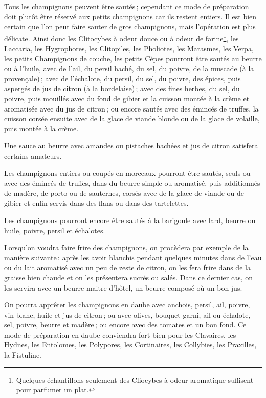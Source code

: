 \medskip

Tous les champignons peuvent être sautés ; cependant ce mode de préparation
doit plutôt être réservé aux petits champignons car ils restent entiers. Il est
bien certain que l'on peut faire sauter de gros champignons, mais l'opération
est plus délicate. Ainsi donc les Clitocybes à odeur douce ou à odeur de
farine\footnote{Quelques échantillons seulement des Cliocybes à odeur
aromatique suffisent pour parfumer un plat.}, les Laccaria, les Hygrophores,
les Clitopiles, les Pholiotes, les Marasmes, les Verpa, les petits Champignons
de couche, les petits Cèpes pourront être sautés au beurre ou à l'huile, avec
de l'ail, du persil haché, du sel, du poivre, de la muscade (à la provençale) ;
avec de l'échalote, du persil, du sel, du poivre, des épices, puis aspergés de
jus de citron (à la bordelaise) ; avec des fines herbes, du sel, du poivre,
puis mouillés avec du fond de gibier et la cuisson montée à la crème et
aromatisée avec du jus de citron ; ou encore sautés avec des émincés de
truffes, la cuisson corsée ensuite avec de la glace de viande blonde ou de la
glace de volaille, puis montée à la crème.

Une sauce au beurre avec amandes ou pistaches hachées et jus de citron
satisfera certains amateurs.

Les champignons entiers ou coupés en morceaux pourront être sautés, seuls ou
avec des émincés de truffes, dans du beurre simple ou aromatisé, puis
additionnés de madère, de porto ou de sauternes, corsés avec de la glace de
viande ou de gibier et enfin servis dans des flans ou dans des tartelettes.

Les champignons pourront encore être sautés à la barigoule avec lard, beurre
ou huile, poivre, persil et échalotes.

\medskip

Lorsqu'on voudra faire frire des champignons, on procèdera par exemple de la
manière suivante : après les avoir blanchis pendant quelques minutes dans de
l'eau ou du lait aromatisé avec un peu de zeste de citron, on les fera frire
dans de la graisse bien chaude et on les présentera sucrés ou salés. Dans ce
dernier cas, on les servira avec un beurre maitre d'hôtel, un beurre composé où
un bon jus.

On pourra apprêter les champignons en daube avec anchois, persil, ail, poivre,
vin blanc, huile et jus de citron ; ou avec olives, bouquet garni, ail ou échalote,
sel, poivre, beurre et madère ; ou encore avec des tomates et un bon fond. Ce
mode de préparation en daube conviendra fort bien pour les Clavaires, les Hydnes,
les Entolomes, les Polypores, les Cortinaires, les Collybies, les Praxilles, la
Fistuline.

